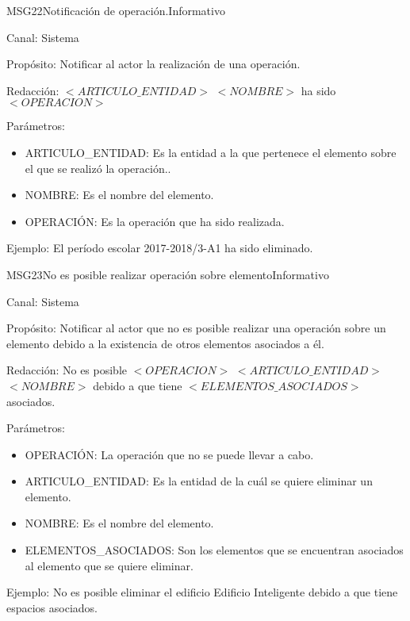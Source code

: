 \begin{mensaje}{MSG22}{Notificación de operación.}{Informativo}
	\item[Canal:] Sistema
	\item[Propósito:] Notificar al actor la realización de una operación.
	\item[Redacción:] $<ARTICULO\_ENTIDAD>$ $<NOMBRE>$ ha sido $<OPERACION>$
	\item[Parámetros:] 
	\begin{itemize}
		\item ARTICULO\_ENTIDAD: Es la entidad a la que pertenece el elemento sobre el que se realizó la operación..
		\item NOMBRE: Es el nombre del elemento.
		\item OPERACIÓN: Es la operación que ha sido realizada.
	\end{itemize}
	\item[Ejemplo:] El período escolar 2017-2018/3-A1 ha sido eliminado.
	
\end{mensaje}

\begin{mensaje}{MSG23}{No es posible realizar operación sobre elemento}{Informativo}
	\item[Canal:] Sistema
	\item[Propósito:] Notificar al actor que no es posible realizar una operación sobre un elemento debido a la existencia de otros elementos asociados a él.
	\item[Redacción:] No es posible $<OPERACION>$ $<ARTICULO\_ENTIDAD>$ $<NOMBRE>$ debido a que tiene $<ELEMENTOS\_ASOCIADOS>$ asociados.
	\item[Parámetros:] 
	\begin{itemize}
		\item OPERACIÓN: La operación que no se puede llevar a cabo.
		\item ARTICULO\_ENTIDAD: Es la entidad de la cuál se quiere eliminar un elemento.
		\item NOMBRE: Es el nombre del elemento.
		\item ELEMENTOS\_ASOCIADOS: Son los elementos que se encuentran asociados al elemento que se quiere eliminar.
	\end{itemize}
	\item[Ejemplo:] No es posible eliminar el edificio Edificio Inteligente debido a que tiene espacios asociados. 
	
\end{mensaje}

